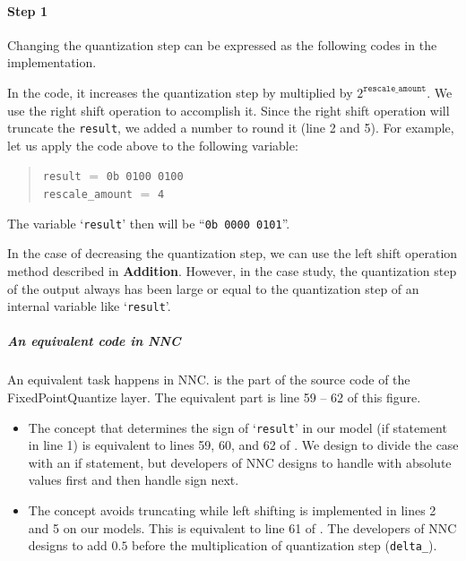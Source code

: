 
\paragraph{Step 1}
Changing the quantization step can be expressed as the following codes in the implementation. %
\begin{quote}
  
\end{quote}


In the code, it increases the quantization step by multiplied by $2^{\texttt{rescale\_amount}}$. We use the right shift operation to accomplish it. Since the right shift operation will truncate the \texttt{result}, we added a number to round it (line 2 and 5). For example, let us apply the code above to the following variable:
\begin{quote}
  \texttt{result} $=$ \texttt{0b 0100 0100}\\
  \texttt{rescale\_amount} $=$ \texttt{4}
\end{quote}
The variable `\texttt{result}' then will be ``\texttt{0b 0000 0101}''.

In the case of decreasing the quantization step, we can use the left shift operation method described in \textbf{Addition}. However, in the case study, the quantization step of the output always has been large or equal to the quantization step of an internal variable like `\texttt{result}'.

\subparagraph{An equivalent code in NNC}
An equivalent task happens in NNC.  is the part of the source code of the FixedPointQuantize layer. The equivalent part is line 59 -- 62 of this figure.

\begin{itemize}
  \item The concept that determines the sign of `\texttt{result}' in our model (if statement in line 1) is equivalent to lines 59, 60, and 62 of . We design to divide the case with an if statement, but developers of NNC designs to handle with absolute values first and then handle sign next.

  \item The concept avoids truncating while left shifting is implemented in lines 2 and 5 on our models. This is equivalent to line 61 of . The developers of NNC designs to add $0.5$ before the multiplication of quantization step (\texttt{delta\_}).
\end{itemize}


